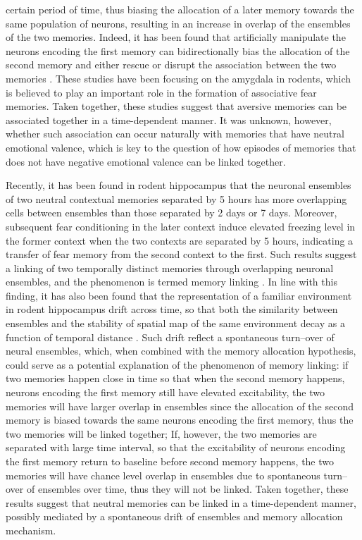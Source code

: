 \documentclass[master.tex]{subfiles}
\begin{document}
certain period of time, thus biasing the allocation of a later memory towards
the same population of neurons, resulting in an increase in overlap of the
ensembles of the two memories. Indeed, it has been found that artificially
manipulate the neurons encoding the first memory can bidirectionally bias the
allocation of the second memory and either rescue or disrupt the association
between the two memories \cite{rashid_competition_2016}. These studies have been
focusing on the amygdala in rodents, which is believed to play an important role
in the formation of associative fear memories. Taken together, these studies
suggest that aversive memories can be associated together in a time-dependent
manner. It was unknown, however, whether such association can occur naturally
with memories that have neutral emotional valence, which is key to the question
of how episodes of memories that does not have negative emotional valence can be
linked together.

Recently, it has been found in rodent hippocampus that the neuronal ensembles of
two neutral contextual memories separated by 5 hours has more overlapping cells
between ensembles than those separated by 2 days or 7 days. Moreover, subsequent
fear conditioning in the later context induce elevated freezing level in the
former context when the two contexts are separated by 5 hours, indicating a
transfer of fear memory from the second context to the first. Such results
suggest a linking of two temporally distinct memories through overlapping
neuronal ensembles, and the phenomenon is termed memory linking
\cite{cai_shared_2016}. In line with this finding, it has also been found that
the representation of a familiar environment in rodent hippocampus drift across
time, so that both the similarity between ensembles and the stability of spatial
map of the same environment decay as a function of temporal distance
\cite{mankin_neuronal_2012, ziv_long-term_2013-1}. Such drift reflect a
spontaneous turn--over of neural ensembles, which, when combined with the memory
allocation hypothesis, could serve as a potential explanation of the phenomenon
of memory linking: if two memories happen close in time so that when the second
memory happens, neurons encoding the first memory still have elevated
excitability, the two memories will have larger overlap in ensembles since the
allocation of the second memory is biased towards the same neurons encoding the
first memory, thus the two memories will be linked together; If, however, the
two memories are separated with large time interval, so that the excitability of
neurons encoding the first memory return to baseline before second memory
happens, the two memories will have chance level overlap in ensembles due to
spontaneous turn--over of ensembles over time, thus they will not be linked.
Taken together, these results suggest that neutral memories can be linked in a
time-dependent manner, possibly mediated by a spontaneous drift of ensembles and
memory allocation mechanism.
\end{document}
